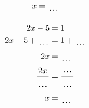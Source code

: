 \documentclass[12pt]{article}
\newcounter{minipagecount}
\begin{document}
\begin{multicols}{2}
\begin{minipage}[t]{0.45\textwidth}
\begin{align*}
        x &= \dotuline{\hspace{5mm}}\\
    \end{align*}
\end{minipage} %
\noindent{(\theminipagecount)}\hspace{0.1mm} %
\begin{minipage}[t]{0.45\textwidth} %
    \vspace{-26pt}  %
    \raggedright %
    \begin{align*} %
        2x - 5 &= 1\\
        2x - 5 + \dotuline{\hspace{5mm}} &= 1 + \dotuline{\hspace{5mm}}\\
        2x &= \dotuline{\hspace{5mm}}\\
        \frac{2x}{\dotuline{\hspace{5mm}}} &= \frac{\dotuline{\hspace{5mm}}}{\dotuline{\hspace{5mm}}}\\
        x &= \dotuline{\hspace{5mm}}\\
    \end{align*}
\end{minipage} %
\noindent{(\theminipagecount)}\hspace{0.1mm} %
\begin{minipage}[t]{0.45\textwidth} %
    \vspace{-26pt}  %

\end{minipage}
\end{multicols}
\end{document}
